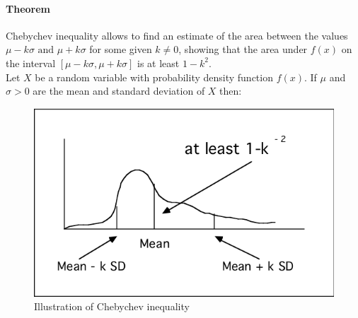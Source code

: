 \paragraph{Theorem}
Chebychev inequality allows to find an estimate of the area between the
values $\mu-k\sigma\text{ and }\mu+k\sigma$ for some given $k\neq 0$, showing
that the area under $f(x)$ on the interval $\left[\mu-k\sigma, \mu+k\sigma
\right]$ is at least $1-k^{2}$.\\
Let $X$ be a random variable with probability density function $f(x)$. If
$\mu$ and $\sigma>0$ are the mean and standard deviation of $X$ then:
\begin{center}
\end{center}
\begin{figure}[H]
	\begin{center}
		\includegraphics[width=\textwidth]{./chaps/13sec/4images/1IneqCheby.png}
	\end{center}
	\caption{Illustration of Chebychev inequality}
	\label{fig:fig2}
\end{figure}
